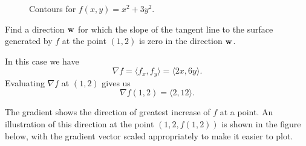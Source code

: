 \begin{exercises}
\begin{figure}[ht]
\begin{center}
\begin{minipage}{2.5in}
\begin{center}
\end{center}
\caption{Contours for $f(x,y) = x^2+3y^2$.}
\label{F:10.6.Grad_ex_contours}
\end{minipage}
\end{center}
\end{figure}

	\item Find a direction $\mathbf{w}$ for which the slope of the tangent line to the surface generated by $f$ at the point $(1,2)$ is zero in the direction $\mathbf{w}$.

    \ea

\begin{exerciseSolution}
\ba 
   \item In this case we have
\[\nabla f = \langle f_x, f_y \rangle = \langle 2x, 6y \rangle.\]
 Evaluating $\nabla f$ at $(1,2)$ gives us
\[\nabla f(1,2) = \langle 2, 12 \rangle.\]

	\item The gradient shows the direction of greatest increase of $f$ at a point. An illustration of this direction at the point $(1,2,f(1,2))$ is shown in the figure below, with the gradient vector scaled appropriately to make it easier to plot. 
\begin{center}
\end{center}


\end{exerciseSolution}
\end{exercises}
